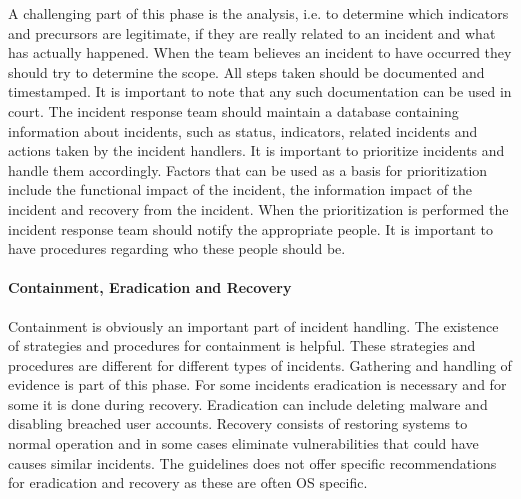 A challenging part of this phase is the analysis, i.e. to determine which indicators and precursors are legitimate, if they are really related to an incident and what has actually happened. When the team believes an incident to have occurred they should try to determine the scope. All steps taken should be documented and timestamped. It is important to note that any such documentation can be used in court. The incident response team should maintain a database containing information about incidents, such as status, indicators, related incidents and actions taken by the incident handlers. It is important to prioritize incidents and handle them accordingly. Factors that can be used as a basis for prioritization include the functional impact of the incident, the information impact of the incident and recovery from the incident. When the prioritization is performed the incident response team should notify the appropriate people. It is important to have procedures regarding who these people should be.

\paragraph{Containment, Eradication and Recovery}
Containment is obviously an important part of incident handling. The existence of strategies and procedures for containment is helpful. These strategies and procedures are different for different types of incidents. Gathering and handling of evidence is part of this phase. For some incidents eradication is necessary and for some it is done during recovery. Eradication can include deleting malware and disabling breached user accounts. Recovery consists of restoring systems to normal operation and in some cases eliminate vulnerabilities that could have causes similar incidents. The guidelines does not offer specific recommendations for eradication and recovery as these are often OS specific. 

